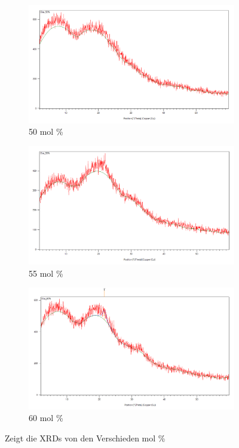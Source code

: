 \documentclass[12pt, a4paper]{article}
\begin{document}
\begin{figure}[h]
\begin{subfigure}[b]{0.3\textwidth}
  \centering
  \includegraphics[width=\linewidth]{50pro.png}
  \caption{50 mol \% }
  \label{fig:sub5}
\end{subfigure}
\hfill
\begin{subfigure}[b]{0.3\textwidth}
  \centering
  \includegraphics[width=\linewidth]{55pro.png}
  \caption{55 mol \% }
  \label{fig:sub6}
\end{subfigure}
\hfill
\begin{subfigure}[b]{0.3\textwidth}
  \centering
  \includegraphics[width=\linewidth]{60pro.png}
  \caption{60 mol \% }
  \label{fig:sub7}
\end{subfigure}

\caption{Zeigt die XRDs von den Verschieden mol \%  }
\label{fig:sieben_bilder}
\end{figure}
\end{document}
